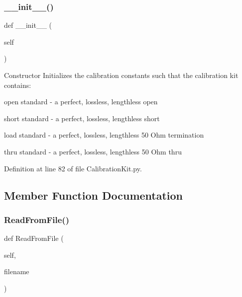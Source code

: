 \subsubsection{\texorpdfstring{\+\_\+\+\_\+init\+\_\+\+\_\+()}{\_\_init\_\_()}}
{\footnotesize\ttfamily def \+\_\+\+\_\+init\+\_\+\+\_\+ (\begin{DoxyParamCaption}\item[{}]{self }\end{DoxyParamCaption})}



Constructor Initializes the calibration constants such that the calibration kit contains\+: 


\begin{DoxyItemize}
\item open standard -\/ a perfect, lossless, lengthless open
\item short standard -\/ a perfect, lossless, lengthless short
\item load standard -\/ a perfect, lossless, lengthless 50 Ohm termination
\item thru standard -\/ a perfect, lossless, lengthless 50 Ohm thru 
\end{DoxyItemize}

Definition at line 82 of file Calibration\+Kit.\+py.



\subsection{Member Function Documentation}
\mbox{\label{classSignalIntegrity_1_1Measurement_1_1CalKit_1_1CalibrationKit_1_1CalibrationConstants_a3dc78f8134b7196685f6b0b5ace5e33b}} 
\subsubsection{\texorpdfstring{Read\+From\+File()}{ReadFromFile()}}
{\footnotesize\ttfamily def Read\+From\+File (\begin{DoxyParamCaption}\item[{}]{self,  }\item[{}]{filename }\end{DoxyParamCaption})}



